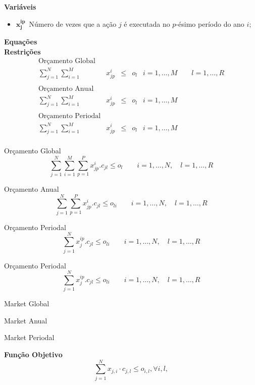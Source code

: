 \documentclass{article}
\newcommand{\topico}[1]{
  \vspace{10pt}
  {\Large \bf #1 }
  \\
}
\newcommand{\variavel}[1]{
  { \Large $ \bm{ #1 } \, $}
}
\begin{document}
\topico{Variáveis}

\begin{itemize}
  \item \variavel{x_j^{ip}} Número de vezes que a ação $j$ é executada no $p$-ésimo período do ano $i$;
\end{itemize}

\topico{Equações}

\topico{Restrições}

\[
\begin{array}{rlcll}
    \text{Orçamento Global} \\
    \displaystyle
    \sum_{j = 1}^N \sum_{i = 1}^M
    & x_{jp}^i
	& \leq
	& o_l
	& i = 1, \ldots, M \qquad l = 1, \ldots, R \\
    \\ \text{Orçamento Anual} \\
    \displaystyle
    \sum_{j = 1}^N \sum_{i = 1}^M
    & x_{jp}^i
	& \leq
	& o_l
	& i = 1, \ldots, M \\
    \\ \text{Orçamento Periodal} \\
    \displaystyle
    \sum_{j = 1}^N \sum_{i = 1}^M
    & x_{jp}^i
	& \leq
	& o_l
	& i = 1, \ldots, M \\
\end{array}
\]

Orçamento Global
\begin{equation}
  \sum_{j = 1}^{N} \sum_{i = 1}^{M} \sum_{p = 1}^{P} x_{jp}^{i} . c_{jl} \leq o_{l}
  	\qquad i = 1, \ldots, N ,\quad l = 1, \ldots, R
\end{equation}

Orçamento Anual
\begin{equation}
  \sum_{j = 1}^{N} \sum_{p = 1}^{P} x_{jp}^{i} . c_{jl} \leq o_{li}
  	\qquad i = 1, \ldots, N ,\quad l = 1, \ldots, R
\end{equation}

Orçamento Periodal
\begin{equation}
  \sum_{j = 1}^{N} x_j^{ip} . c_{jl} \leq o_{li}
  	\qquad i = 1, \ldots, N ,\quad l = 1, \ldots, R
\end{equation}

Orçamento Periodal
\begin{equation}
  \sum_{j = 1}^{N} x_j^{ip} . c_{jl} \leq o_{li}
  	\qquad i = 1, \ldots, N ,\quad l = 1, \ldots, R
\end{equation}

Market Global

Market Anual

Market Periodal

\topico{Função Objetivo}

\begin{equation}
    \sum_{j=1}^{N} x_{j, i} \cdot c_{j,l} \le o_{i,l}, \forall i, l,
  \label{eq:budget}
\end{equation}
\end{document}
